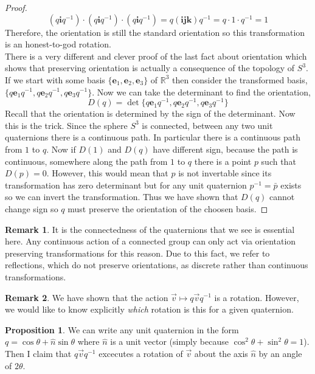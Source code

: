 \documentclass[12pt]{extarticle}
\newcommand{\R}{\mathbb{R}}
\theoremstyle{definition}
\newtheorem{proposition}[theorem]{Proposition}
\newtheorem{remark}{Remark}
\renewcommand{\bf}[1]{\mathbf{#1}}
\begin{document}
\begin{proof}
\[ (q \bf{i} q^{-1}) \cdot (q \bf{i} q^{-1}) \cdot (q \bf{i} q^{-1}) = q ( \bf{i} \bf{j} \bf{k} ) q^{-1} = q \cdot 1 \cdot q^{-1} = 1 \]
Therefore, the orientation is still the standard orientation so this transformation is an honest-to-god rotation. 
\bigskip\\
There is a very different and clever proof of the last fact about orientation which shows that preserving orientation is actually a consequence of the topology of $S^3$. If we start with some basis $\{ \bf{e}_1, \bf{e}_2, \bf{e}_3 \}$ of $\R^3$ then consider the transformed basis, $\{ q \bf{e}_1 q^{-1}, q \bf{e}_2 q^{-1}, q \bf{e}_3 q^{-1} \}$. Now we can take the determinant to find the orientation,
\[ D(q) = \det{\{ q \bf{e}_1 q^{-1}, q \bf{e}_2 q^{-1}, q \bf{e}_3 q^{-1} \}} \]
Recall that the orientation is determined by the sign of the determinant. Now this is the trick. Since the sphere $S^3$ is connected, between any two unit quaternions there is a continuous path. In particular there is a continuous path from $1$ to $q$. Now if $D(1)$ and $D(q)$ have different sign, because the path is continuous, somewhere along the path from $1$ to $q$ there is a point $p$ such that $D(p) = 0$. However, this would mean that $p$ is not invertable since its transformation has zero determinant but for any unit quaternion $p^{-1} = \bar{p}$ exists so we can invert the transformation. Thus we have shown that $D(q)$ cannot change sign so $q$ must preserve the orientation of the choosen basis.
\end{proof}

\begin{remark}
It is the connectedness of the quaternions that we see is essential here. Any continuous action of a connected group can only act via orientation preserving transformations for this reason. Due to this fact, we refer to reflections, which do not preserve orientations, as discrete rather than continuous transformations.   
\end{remark}

\begin{remark}
We have shown that the action $\vec{v} \mapsto q \vec{v} q^{-1}$ is a rotation. However, we would like to know explicitly \textit{which} rotation is this for a given quaternion. 
\end{remark}

\begin{proposition}
We can write any unit quaternion in the form $q = \cos{\theta} + \hat{n} \sin{\theta}$ where $\hat{n}$ is a unit vector (simply because $\cos^2{\theta} + \sin^2{\theta} = 1$). Then I claim that $q \vec{v} q^{-1}$ excecutes a rotation of $\vec{v}$ about the axis $\hat{n}$ by an angle of $2 \theta$. 
\end{proposition}
\end{document}
